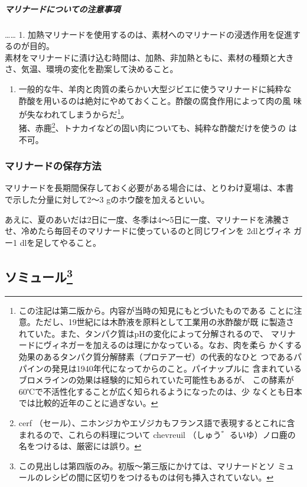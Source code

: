 \begin{recette}
\hypertarget{observation-sur-les-marinades}{%
\subparagraph{マリナードについての注意事項}\label{observation-sur-les-marinades}}

\ldots{}\ldots{} 1.
加熱マリナードを使用するのは、素材へのマリナードの浸透作用を促進するのが目的。\\
素材をマリナードに漬け込む時間は、加熱、非加熱ともに、素材の種類と大き
さ、気温、環境の変化を勘案して決めること。

\begin{enumerate}
\def\labelenumi{\arabic{enumi}.}
\setcounter{enumi}{1}
\tightlist
\item
  一般的な牛、羊肉と肉質の柔らかい大型ジビエに使うマリナードに純粋な
  酢酸を用いるのは絶対にやめておくこと。酢酸の腐食作用によって肉の風
  味が失なわれてしまうからだ\footnote{この注記は第二版から。内容が当時の知見にもとづいたものである
    ことに注意。ただし、19世紀には木酢液を原料として工業用の氷酢酸が既
    に製造されていた。また、タンパク質はpHの変化によって分解されるので、
    マリナードにヴィネガーを加えるのは理にかなっている。なお、肉を柔ら
    かくする効果のあるタンパク質分解酵素（プロテアーゼ）の代表的なひと
    つであるパパインの発見は1940年代になってからのこと。パイナップルに
    含まれているブロメラインの効果は経験的に知られていた可能性もあるが、
    この酵素が60℃で不活性化することが広く知られるようになったのは、少
    なくとも日本では比較的近年のことに過ぎない。}。\\
  猪、赤鹿\footnote{cerf
    （セール）、ニホンジカやエゾジカもフランス語で表現するとこれに含まれるので、これらの料理について
    chevreuil （しゅう゛るいゆ）ノロ鹿の名をつけるは、厳密には誤り。}、トナカイなどの固い肉についても、純粋な酢酸だけを使うの
  は不可。
\end{enumerate}

\hypertarget{conservation-des-marinades}{%
\subsubsection{マリナードの保存方法}\label{conservation-des-marinades}}



マリナードを長期間保存しておく必要がある場合には、とりわけ夏場は、本書
で示した分量に対して2〜3 gのホウ酸を加えるといい。

あえに、夏のあいだは2日に一度、冬季は4〜5日に一度、マリナードを沸騰さ
せ、冷めたら毎回そのマリナードに使っているのと同じワインを 2dlとヴィネ
ガー1 dlを足してやること。
\end{recette}
\hypertarget{saumures}{%
\subsection[ソミュール]{\texorpdfstring{ソミュール\footnote{この見出しは第四版のみ。初版〜第三版にかけては、マリナードとソ
  ミュールのレシピの間に区切りをつけるものは何も挿入されていない。}}{ソミュール}}\label{saumures}}

